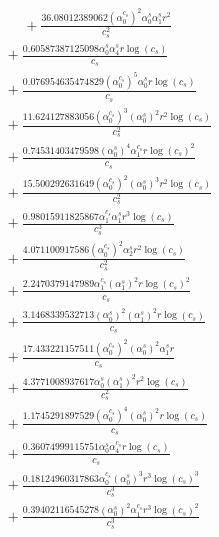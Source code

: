 \documentclass[10pt]{article}
\begin{document}
\begin{align*}
\phantom{R_{2,7}} &\phantom{={}}{}  + \frac{36.08012389062 \left(\alpha_{0}^{c_s}\right)^{2} \alpha_{0}^s \alpha_{1}^s r^{2}}{c_{s}^{2}} \\
&{}  + \frac{0.60587387125098 \alpha_{0}^s \alpha_{4}^s r \log{\left(c_{s} \right)}}{c_{s}} \\
&{}  + \frac{0.076954635474829 \left(\alpha_{0}^{c_s}\right)^{5} \alpha_{0}^s r \log{\left(c_{s} \right)}}{c_{s}} \\
&{}  + \frac{11.624127883056 \left(\alpha_{0}^{c_s}\right)^{3} \left(\alpha_{0}^s\right)^{2} r^{2} \log{\left(c_{s} \right)}}{c_{s}^{2}} \\
&{}  + \frac{0.74531403479598 \left(\alpha_{0}^s\right)^{4} \alpha_{1}^{c_s} r \log{\left(c_{s} \right)}^{2}}{c_{s}} \\
&{}  + \frac{15.500292631649 \left(\alpha_{0}^{c_s}\right)^{2} \left(\alpha_{0}^s\right)^{3} r^{2} \log{\left(c_{s} \right)}}{c_{s}^{2}} \\
&{}  + \frac{0.98015911825867 \alpha_{1}^{c_s} \alpha_{1}^s r^{3} \log{\left(c_{s} \right)}}{c_{s}^{3}} \\
&{}  + \frac{4.071100917586 \left(\alpha_{0}^{c_s}\right)^{2} \alpha_{2}^s r^{2} \log{\left(c_{s} \right)}}{c_{s}^{2}} \\
&{}  + \frac{2.2470379147989 \alpha_{1}^{c_s} \left(\alpha_{1}^s\right)^{2} r \log{\left(c_{s} \right)}^{2}}{c_{s}} \\
&{}  + \frac{3.1468339532713 \left(\alpha_{0}^s\right)^{2} \left(\alpha_{1}^s\right)^{2} r \log{\left(c_{s} \right)}}{c_{s}} \\
&{}  + \frac{17.433221157511 \left(\alpha_{0}^{c_s}\right)^{2} \left(\alpha_{0}^s\right)^{2} \alpha_{1}^s r}{c_{s}} \\
&{}  + \frac{4.3771008937617 \alpha_{0}^s \left(\alpha_{1}^s\right)^{2} r^{2} \log{\left(c_{s} \right)}}{c_{s}^{2}} \\
&{}  + \frac{1.1745291897529 \left(\alpha_{0}^{c_s}\right)^{4} \left(\alpha_{0}^s\right)^{2} r \log{\left(c_{s} \right)}}{c_{s}} \\
&{}  + \frac{0.36074999115751 \alpha_{0}^s \alpha_{4}^{c_s} r \log{\left(c_{s} \right)}}{c_{s}} \\
&{}  + \frac{0.18124960317863 \alpha_{0}^{c_s} \left(\alpha_{0}^s\right)^{3} r^{3} \log{\left(c_{s} \right)}^{3}}{c_{s}^{3}} \\
&{}  + \frac{0.39402116545278 \left(\alpha_{0}^s\right)^{2} \alpha_{1}^{c_s} r^{3} \log{\left(c_{s} \right)}^{2}}{c_{s}^{3}} \\

\end{align*}
\end{document}

